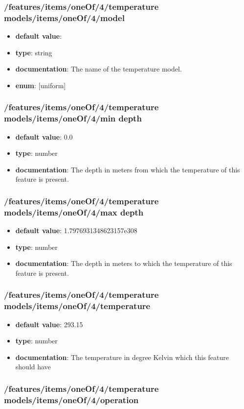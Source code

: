 \subsubsection{/features/items/oneOf/4/temperature models/items/oneOf/4/model}
\begin{itemize}\item {\bf default value}: 
\item {\bf type}: string
\item {\bf documentation}: The name of the temperature model.
\item {\bf enum}: [uniform]\end{itemize}\subsubsection{/features/items/oneOf/4/temperature models/items/oneOf/4/min depth}
\begin{itemize}\item {\bf default value}: 0.0
\item {\bf type}: number
\item {\bf documentation}: The depth in meters from which the temperature of this feature is present.
\end{itemize}\subsubsection{/features/items/oneOf/4/temperature models/items/oneOf/4/max depth}
\begin{itemize}\item {\bf default value}: 1.7976931348623157e308
\item {\bf type}: number
\item {\bf documentation}: The depth in meters to which the temperature of this feature is present.
\end{itemize}\subsubsection{/features/items/oneOf/4/temperature models/items/oneOf/4/temperature}
\begin{itemize}\item {\bf default value}: 293.15
\item {\bf type}: number
\item {\bf documentation}: The temperature in degree Kelvin which this feature should have
\end{itemize}\subsubsection{/features/items/oneOf/4/temperature models/items/oneOf/4/operation}
